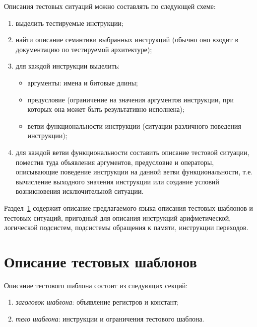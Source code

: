 Описания тестовых ситуаций можно составлять по следующей схеме:
\begin{enumerate}
\item выделить тестируемые инструкции;
\item найти описание семантики выбранных инструкций (обычно оно
входит в документацию по тестируемой архитектуре);
\item для каждой инструкции выделить:
    \begin{itemize}
    \item аргументы: имена и битовые длины;
    \item предусловие (ограничение на значения аргументов
    инструкции, при которых она может быть результативно исполнена);
    \item ветви функциональности инструкции (ситуации различного
    поведения инструкции);
    \end{itemize}
\item для каждой ветви функциональности составить описание тестовой
ситуации, поместив туда объявления аргументов, предусловие и
операторы, описывающие поведение инструкции на данной ветви
функциональности, т.е. вычисление выходного значения инструкции или
создание условий возникновения исключительной ситуации.
\end{enumerate}

Раздел~\ref{tesla} содержит описание предлагаемого языка описания
тестовых шаблонов и тестовых ситуаций, пригодный для описания
инструкций арифметической, логической подсистем, подсистемы
обращения к памяти, инструкции переходов.

\section{Описание тестовых шаблонов}\label{tesla}

Описание тестового шаблона состоит из следующих секций:
\begin{enumerate}
\item \emph{заголовок шаблона}: объявление регистров и констант;
\item \emph{тело шаблона}: инструкции и ограничения тестового
шаблона.
\end{enumerate}

